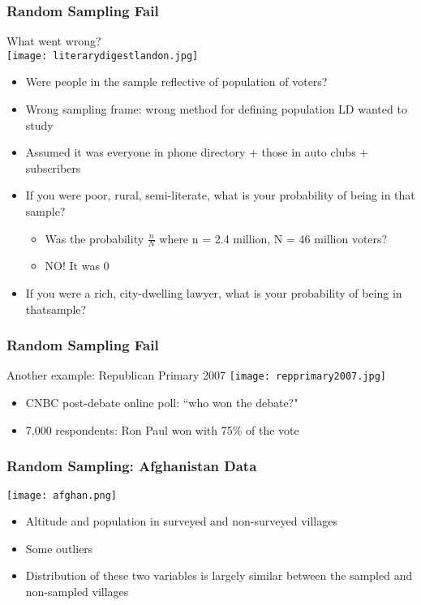 \documentclass{beamer}
\begin{document}
\begin{frame}
 \frametitle{Random Sampling Fail}
 \begin{minipage}{.3\linewidth}
 What went wrong?\\
 \texttt{[image: literarydigestlandon.jpg]}
 \end{minipage}\hfill
 \begin{minipage}{.7\linewidth}
 \begin{itemize}[<+->]
   \item Were people in the sample reflective of population of voters?
   \item Wrong \alert{sampling frame}: wrong method for defining population LD wanted to study
   \item Assumed it was everyone in phone directory + those in auto clubs + subscribers
   \item If you were poor, rural, semi-literate, what is your probability of being in that sample?
      \begin{itemize}
        \item Was the probability $\frac{n}{N}$ where n = 2.4 million, N = 46 million voters?
        \item NO! It was 0
      \end{itemize}
   \item If you were a rich, city-dwelling lawyer, what is your probability of being in thatsample?
 \end{itemize}
 \end{minipage}
\end{frame}

\begin{frame}
 \frametitle{Random Sampling Fail}
 Another example: Republican Primary 2007
 \texttt{[image: repprimary2007.jpg]}
 \begin{itemize}
   \item CNBC post-debate online poll: ``who won the debate?"
   \item 7,000 respondents: Ron Paul won with 75\% of the vote
 \end{itemize}
\end{frame}

\begin{frame}
 \frametitle{Random Sampling: Afghanistan Data}
 \begin{minipage}{.48\linewidth}
 \texttt{[image: afghan.png]}
 \end{minipage}\hfill
 \begin{minipage}{.48\linewidth}
 \begin{itemize}
   \item Altitude and population in surveyed and non-surveyed villages
   \item Some outliers
   \item Distribution of these two variables is largely similar between the sampled and non-sampled villages
 \end{itemize}
 \end{minipage}
\end{frame}
\end{document}
